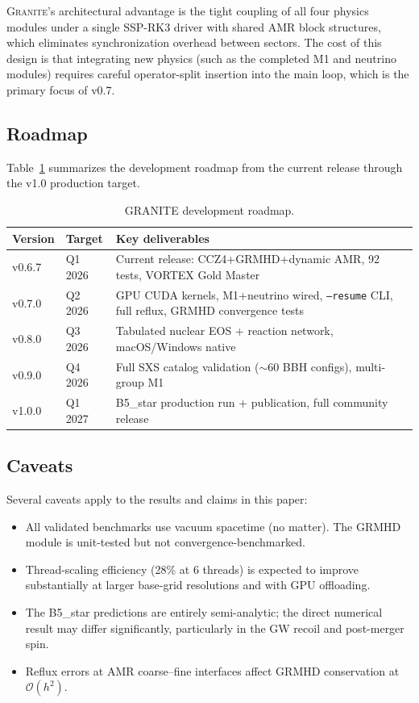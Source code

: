 \documentclass[aps,prd,twocolumn,superscriptaddress,nofootinbib,showpacs,
               longbibliography]{revtex4-2}
\newcommand{\granite}{\textsc{Granite}}
\newcommand{\code}[1]{\texttt{#1}}
\newcommand{\order}[1]{\mathcal{O}(#1)}
\begin{document}
\granite{}'s architectural advantage is the tight coupling of all four
physics modules under a single SSP-RK3 driver with shared AMR block
structures, which eliminates synchronization overhead between sectors.
The cost of this design is that integrating new physics (such as the
completed M1 and neutrino modules) requires careful operator-split
insertion into the main loop, which is the primary focus of v0.7.

\subsection{Roadmap}

Table~\ref{tab:roadmap} summarizes the development roadmap from the current
release through the v1.0 production target.

\begin{table}[t]
\caption{GRANITE development roadmap.}
\label{tab:roadmap}
\begin{ruledtabular}
\begin{tabular}{llp{4.5cm}}
  Version & Target & Key deliverables \\ \hline
  v0.6.7 & Q1 2026 & Current release: CCZ4+GRMHD+dynamic AMR, 92 tests, VORTEX Gold Master \\
  v0.7.0 & Q2 2026 & GPU CUDA kernels, M1+neutrino wired, \code{--resume} CLI, full reflux, GRMHD convergence tests \\
  v0.8.0 & Q3 2026 & Tabulated nuclear EOS + reaction network, macOS/Windows native \\
  v0.9.0 & Q4 2026 & Full SXS catalog validation (${\sim}60$ BBH configs), multi-group M1 \\
  v1.0.0 & Q1 2027 & B5\_star production run + publication, full community release \\
\end{tabular}
\end{ruledtabular}
\end{table}

\subsection{Caveats}

Several caveats apply to the results and claims in this paper:
\begin{itemize}[nosep]
  \item All validated benchmarks use vacuum spacetime (no matter).
    The GRMHD module is unit-tested but not convergence-benchmarked.
  \item Thread-scaling efficiency (28\% at 6 threads) is expected to improve
    substantially at larger base-grid resolutions and with GPU offloading.
  \item The B5\_star predictions are entirely semi-analytic; the direct
    numerical result may differ significantly, particularly in the GW
    recoil and post-merger spin.
  \item Reflux errors at AMR coarse--fine interfaces affect GRMHD
    conservation at $\order{h^2}$.
\end{itemize}
\end{document}
